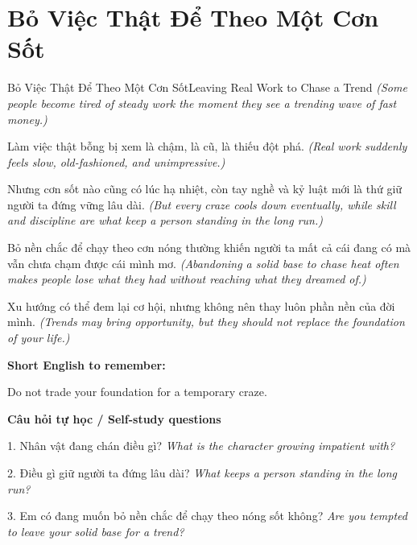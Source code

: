 \section{Bỏ Việc Thật Để Theo Một Cơn Sốt}
\begin{truyen}{Bỏ Việc Thật Để Theo Một Cơn Sốt}{Leaving Real Work to Chase a Trend}
\textit{(Some people become tired of steady work the moment they see a trending wave of fast money.)}

Làm việc thật bỗng bị xem là chậm, là cũ, là thiếu đột phá.
\textit{(Real work suddenly feels slow, old-fashioned, and unimpressive.)}

Nhưng cơn sốt nào cũng có lúc hạ nhiệt, còn tay nghề và kỷ luật mới là thứ giữ người ta đứng vững lâu dài.
\textit{(But every craze cools down eventually, while skill and discipline are what keep a person standing in the long run.)}

Bỏ nền chắc để chạy theo cơn nóng thường khiến người ta mất cả cái đang có mà vẫn chưa chạm được cái mình mơ.
\textit{(Abandoning a solid base to chase heat often makes people lose what they had without reaching what they dreamed of.)}

\end{truyen}

\begin{baihoc}
Xu hướng có thể đem lại cơ hội, nhưng không nên thay luôn phần nền của đời mình.
\textit{(Trends may bring opportunity, but they should not replace the foundation of your life.)}
\end{baihoc}

\begin{ghinhoanh}
\textbf{Short English to remember:}

Do not trade your foundation for a temporary craze.

\end{ghinhoanh}

\begin{tuhocnhanh}
\textbf{Câu hỏi tự học / Self-study questions}

1. Nhân vật đang chán điều gì? \textit{What is the character growing impatient with?}

2. Điều gì giữ người ta đứng lâu dài? \textit{What keeps a person standing in the long run?}

3. Em có đang muốn bỏ nền chắc để chạy theo nóng sốt không? \textit{Are you tempted to leave your solid base for a trend?}
\end{tuhocnhanh}
\ngancach

